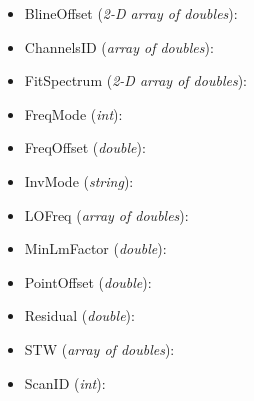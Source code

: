 \begin{itemize}
  \item BlineOffset (\emph{2-D array of doubles}):
  \item ChannelsID (\emph{array of doubles}):
  \item FitSpectrum (\emph{2-D array of doubles}):
  \item FreqMode (\emph{int}):
  \item FreqOffset (\emph{double}):
  \item InvMode (\emph{string}):
  \item LOFreq (\emph{array of doubles}):
  \item MinLmFactor (\emph{double}):
  \item PointOffset (\emph{double}):
  \item Residual (\emph{double}):
  \item STW (\emph{array of doubles}):
  \item ScanID (\emph{int}):
\end{itemize}



